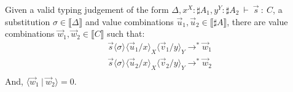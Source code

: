 \documentclass[a4paper,UKenglish,numberwithinsect,pdfa,anonymous]{lipics-v2021}
\theoremstyle{restatestyle}
\newcommand\lra{\longrightarrow}
\newcommand\ansubst[2]{\ensuremath{\langle #1 \rangle_{#2}}}
\def\scal#1#2{\langle{#1}~|~{#2}\rangle}
\def\eval{\lra^*}
\def\sem#1{\llbracket#1\rrbracket}
\def\TYP#1#2#3{#1~{\vdash}~#2~{:}~#3}
\begin{document}
\begin{lemma}\label{lem:OrthogonalSubstitution} %
Given a valid typing judgement of the form $\TYP{\Delta, x^{X}:\sharp A_1, y^{Y}: \sharp A_2}{\vec{s}}{C}$, a substitution $\sigma\in\sem{\Delta}$ and value combinations $\vec{u}_{1},\vec{u}_{2}\in\sem{\sharp A}$, there are value combinations $\vec{w}_{1},\vec{w}_{2}\in\sem{C}$ such that:
\[
\begin{array}{c}
    \vec{s}\ansubst{\sigma}{}\ansubst{\vec{u}_{1}/x}{X}{\ansubst{\vec{v}_{1}/y}{Y}}\eval\vec{w}_{1}\\
    \vec{s}\ansubst{\sigma}{}\ansubst{\vec{u}_{2}/x}{X}{\ansubst{\vec{v}_{2}/y}{Y}}\eval\vec{w}_{2}\\
\end{array}
\]
And, $\scal{\vec{w}_{1}}{\vec{w}_{2}} = 0$.
\end{lemma}
\end{document}
